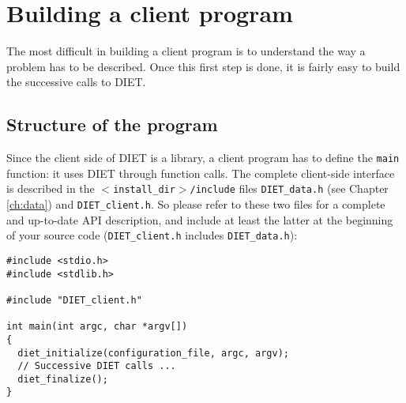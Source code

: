 
\chapter{Building a client program}
\label{ch:client}

The most difficult in building a client program is to understand the way a
problem has to be described. Once this first step is done, it is fairly easy to
build the successive calls to DIET.


\section{Structure of the program}
\label{sec:cl_struct}

Since the client side of DIET is a library, a client program has to define the
\texttt{main} function: it uses DIET through function calls. The complete
client-side interface is described in the \texttt{$<$install\_dir$>$/include}
files \texttt{DIET\_data.h} (see Chapter \ref{ch:data}) and
\texttt{DIET\_client.h}. So please refer to these two files for a complete and
up-to-date API description, and include at least the latter at the beginning of
your source code (\texttt{DIET\_client.h} includes \texttt{DIET\_data.h}):
{\footnotesize
\begin{verbatim}
#include <stdio.h>
#include <stdlib.h>

#include "DIET_client.h"

int main(int argc, char *argv[])
{
  diet_initialize(configuration_file, argc, argv);
  // Successive DIET calls ...
  diet_finalize();
}
\end{verbatim}
}

